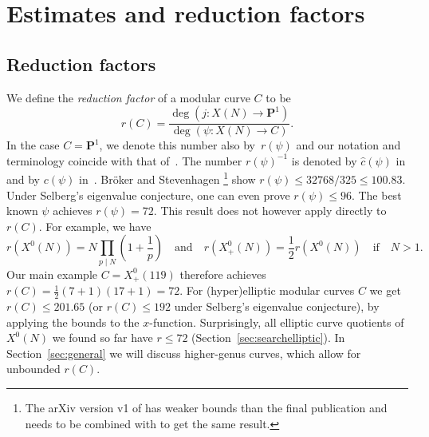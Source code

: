 \documentclass{amsart}
\newcommand{\PP}{\mathbf{P}}
\newcommand{\xnul}[1]{X^0(#1)}
\newcommand{\xnulN}{\xnul{N}}
\newcommand{\xplus}[1]{X^0_+(#1)}
\newcommand{\xplusN}{\xplus{N}}
\newcommand{\curve}{C}
\numberwithin{equation}{section}
\theoremstyle{definition}
\begin{document}
\section{Estimates and reduction factors}\label{sec:reductionfactors}


\subsection{Reduction factors}


We define  the \emph{reduction factor}
of a modular curve $\curve$
to be
\begin{equation}\label{eq:reductiondef}
	r(\curve) = \frac{\deg(j : X(N)\rightarrow \PP^1)}{\deg(\psi : X(N) \rightarrow \curve)}.
\end{equation}
In the case $\curve =\PP^1$, we denote this number also by~$r(\psi)$
and our notation and terminology coincide with 
that of~\cite{broker-stevenhagen-constructing}.
The number $r(\psi)^{-1}$ is denoted by
$\widehat{c}(\psi)$
in \cite{enge-morain2002}
and by $c(\psi)$ in~\cite{enge-morain2014}.
Br\"oker and Stevenhagen \cite[Theorem~4.1]{broker-stevenhagen-constructing}\footnote{The
arXiv version v1 of \cite{broker-stevenhagen-constructing} has weaker bounds than the final
publication and needs to be combined with \cite[Appendix~2]{Kim} to get the same result.}
show $r(\psi)\leq 32768/325 \leq 100.83$.
Under Selberg's eigenvalue conjecture,
one can even prove $r(\psi)\leq 96$.
The best known $\psi$ achieves $r(\psi) = 72$.
This result does not however apply directly to $r(\curve)$.
For example, we have
\begin{equation}\label{eq:reductionx0}
	r(\xnulN) = N\prod_{p\mid N} (1+\frac{1}{p})
\quad\mbox{and}\quad
r(\xplusN) = \frac{1}{2} r(\xnulN)
\quad\mbox{if}\quad N>1.
\end{equation}
Our main example $\curve = \xplus{119}$ therefore achieves
$r(C) = \frac{1}{2}(7+1)(17+1)=72$. For (hyper)elliptic modular curves $\curve$
we get $r(C) \leq 201.65$
(or $r(C) \leq 192$ 
under Selberg's eigenvalue conjecture), by applying the bounds to the $x$-function.
Surprisingly, all elliptic curve quotients of $\xnulN$
we found so far have $r\leq 72$ (Section~\ref{sec:searchelliptic}).
In Section~\ref{sec:general} we will discuss
higher-genus curves, which allow for unbounded
$r(\curve)$.
\end{document}
